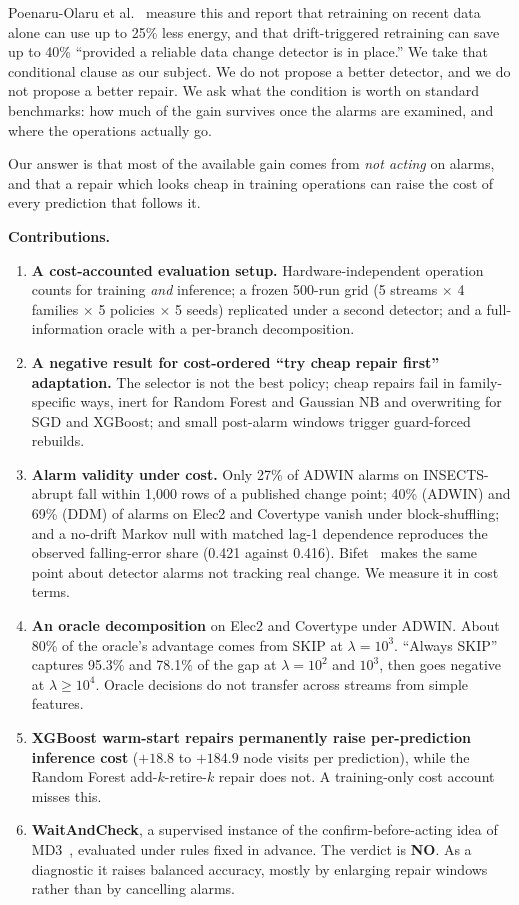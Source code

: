 \documentclass[conference]{IEEEtran}
\begin{document}
Poenaru-Olaru et al.~\cite{poenaruolaru2025} measure this and report that
retraining on recent data alone can use up to 25\% less energy, and that
drift-triggered retraining can save up to 40\% ``provided a reliable data change
detector is in place.'' We take that conditional clause as our subject. We do not
propose a better detector, and we do not propose a better repair. We ask what the
condition is worth on standard benchmarks: how much of the gain survives once the
alarms are examined, and where the operations actually go.

Our answer is that most of the available gain comes from \emph{not acting} on
alarms, and that a repair which looks cheap in training operations can raise the
cost of every prediction that follows it.

\textbf{Contributions.}
\begin{enumerate}
\item \textbf{A cost-accounted evaluation setup.} Hardware-independent operation
counts for training \emph{and} inference; a frozen 500-run grid (5 streams
$\times$ 4 families $\times$ 5 policies $\times$ 5 seeds) replicated under a
second detector; and a full-information oracle with a per-branch decomposition.
\item \textbf{A negative result for cost-ordered ``try cheap repair first''
adaptation.} The selector is not the best policy; cheap repairs fail in
family-specific ways, inert for Random Forest and Gaussian NB and overwriting for
SGD and XGBoost; and small post-alarm windows trigger guard-forced rebuilds.
\item \textbf{Alarm validity under cost.} Only 27\% of ADWIN alarms on
INSECTS-abrupt fall within 1{,}000 rows of a published change point; 40\% (ADWIN)
and 69\% (DDM) of alarms on Elec2 and Covertype vanish under block-shuffling; and
a no-drift Markov null with matched lag-1 dependence reproduces the observed
falling-error share (0.421 against 0.416). Bifet~\cite{bifet2017} makes the same
point about detector alarms not tracking real change. We measure it in cost
terms.
\item \textbf{An oracle decomposition} on Elec2 and Covertype under ADWIN. About
80\% of the oracle's advantage comes from SKIP at $\lambda=10^3$. ``Always SKIP''
captures 95.3\% and 78.1\% of the gap at $\lambda=10^2$ and $10^3$, then goes
negative at $\lambda \geq 10^4$. Oracle decisions do not transfer across streams
from simple features.
\item \textbf{XGBoost warm-start repairs permanently raise per-prediction
inference cost} ($+18.8$ to $+184.9$ node visits per prediction), while the
Random Forest add-$k$-retire-$k$ repair does not. A training-only cost account
misses this.
\item \textbf{WaitAndCheck}, a supervised instance of the confirm-before-acting
idea of MD3~\cite{sethi2017}, evaluated under rules fixed in advance. The verdict
is \textbf{NO}. As a diagnostic it raises balanced accuracy, mostly by enlarging
repair windows rather than by cancelling alarms.
\end{enumerate}
\end{document}
